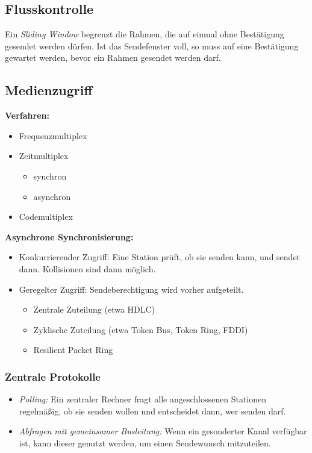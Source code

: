 \documentclass[a4paper,parskip=half*,DIV=15,fontsize=11pt]{scrartcl}
\begin{document}
\subsection{Flusskontrolle}

Ein \emph{Sliding Window} begrenzt die Rahmen, die auf einmal ohne Bestätigung gesendet werden dürfen. Ist das Sendefenster voll, so muss auf eine Bestätigung gewartet werden, bevor ein Rahmen gesendet werden darf.

\subsection{Medienzugriff}

\begin{minipage}[t]{0.35\textwidth}
\textbf{Verfahren:}
\begin{itemize}
\item Frequenzmultiplex
\item Zeitmultiplex
	\begin{itemize}
	\item synchron
    \item asynchron
	\end{itemize}
\item Codemultiplex
\end{itemize}
\end{minipage}
\begin{minipage}[t]{0.65\textwidth}
\textbf{Asynchrone Synchronisierung:}
\begin{itemize}
\item Konkurrierender Zugriff: Eine Station prüft, ob sie senden kann, und sendet dann. Kollisionen sind dann möglich.
\item Geregelter Zugriff: Sendeberechtigung wird vorher aufgeteilt.
	\begin{itemize}
    \item Zentrale Zuteilung (etwa HDLC)
	\item Zyklische Zuteilung (etwa Token Bus, Token Ring, FDDI)
    \item Resilient Packet Ring
	\end{itemize}
\end{itemize}
\end{minipage}

\subsubsection{Zentrale Protokolle}

\begin{itemize}
\item \emph{Polling:} Ein zentraler Rechner fragt alle angeschlossenen Stationen regelmäßig, ob sie senden wollen und entscheidet dann, wer senden darf.
\item \emph{Abfragen mit gemeinsamer Busleitung:} Wenn ein gesonderter Kanal verfügbar ist, kann dieser genutzt werden, um einen Sendewunsch mitzuteilen.
\end{itemize}
\end{document}
